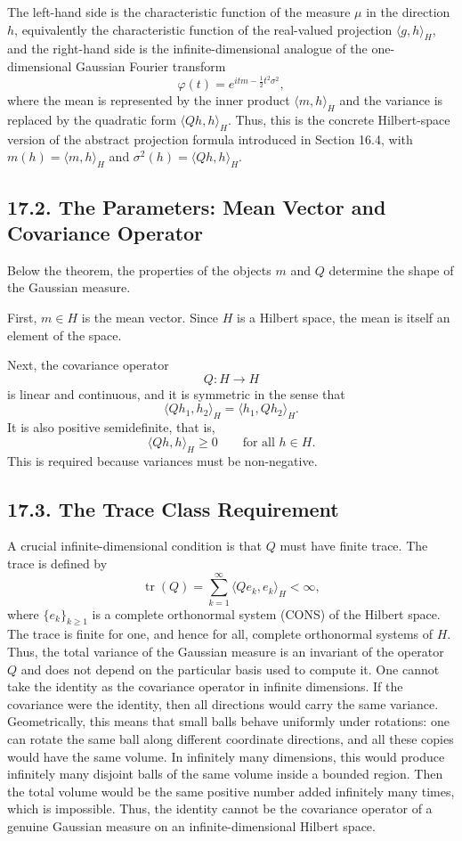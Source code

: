 \documentclass[11pt]{article}
\theoremstyle{definition}
\theoremstyle{remark}
\begin{document}
The left-hand side is the characteristic function of the measure \(\mu\) in the direction \(h\), equivalently the characteristic function of the real-valued projection \(\langle g,h\rangle_H\), and the right-hand side is the infinite-dimensional analogue of the one-dimensional Gaussian Fourier transform
\[
\varphi(t)=e^{itm-\frac12 t^2\sigma^2},
\]
where the mean is represented by the inner product $\langle m,h\rangle_H$ and the variance is replaced by the quadratic form $\langle Qh,h\rangle_H$.
Thus, this is the concrete Hilbert-space version of the abstract projection formula introduced in Section 16.4, with $m(h)=\langle m,h\rangle_H$ and $\sigma^2(h)=\langle Qh,h\rangle_H$.

\subsection*{17.2. The Parameters: Mean Vector and Covariance Operator}
Below the theorem, the properties of the objects $m$ and $Q$ determine the shape of the Gaussian measure.

First, $m\in H$ is the mean vector. Since $H$ is a Hilbert space, the mean is itself an element of the space.

Next, the covariance operator
\[
Q:H\to H
\]
is linear and continuous, and it is symmetric in the sense that
\[
\langle Qh_1,h_2\rangle_H=\langle h_1,Qh_2\rangle_H.
\]
It is also positive semidefinite, that is,
\[
\langle Qh,h\rangle_H\ge 0
\qquad \text{for all } h\in H.
\]
This is required because variances must be non-negative.

\subsection*{17.3. The Trace Class Requirement}
A crucial infinite-dimensional condition is that $Q$ must have finite trace. The trace is defined by
\[
\operatorname{tr}(Q)=\sum_{k=1}^{\infty}\langle Qe_k,e_k\rangle_H<\infty,
\]
where $\{e_k\}_{k\ge 1}$ is a complete orthonormal system (CONS) of the Hilbert space. The trace is finite for one, and hence for all, complete orthonormal systems of $H$. Thus, the total variance of the Gaussian measure is an invariant of the operator $Q$ and does not depend on the particular basis used to compute it.
One cannot take the identity as the covariance operator in infinite dimensions. If the covariance were the identity, then all directions would carry the same variance. Geometrically, this means that small balls behave uniformly under rotations: one can rotate the same ball along different coordinate directions, and all these copies would have the same volume. In infinitely many dimensions, this would produce infinitely many disjoint balls of the same volume inside a bounded region. Then the total volume would be the same positive number added infinitely many times, which is impossible. Thus, the identity cannot be the covariance operator of a genuine Gaussian measure on an infinite-dimensional Hilbert space.
\end{document}
